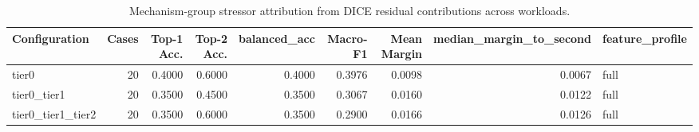 \begin{table}[t]
\centering
\caption{Mechanism-group stressor attribution from DICE residual contributions across workloads.}
\label{tab:dice_stressor_diagnosis}
\footnotesize
\begin{tabular}{lrrrrrrrl}
\toprule
Configuration & Cases & Top-1 Acc. & Top-2 Acc. & balanced_acc & Macro-F1 & Mean Margin & median_margin_to_second & feature_profile \\
\midrule
tier0 & 20 & 0.4000 & 0.6000 & 0.4000 & 0.3976 & 0.0098 & 0.0067 & full \\
tier0_tier1 & 20 & 0.3500 & 0.4500 & 0.3500 & 0.3067 & 0.0160 & 0.0122 & full \\
tier0_tier1_tier2 & 20 & 0.3500 & 0.6000 & 0.3500 & 0.2900 & 0.0166 & 0.0126 & full \\
\bottomrule
\end{tabular}

\end{table}
